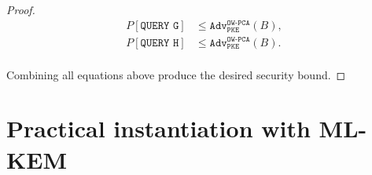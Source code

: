 \documentclass[letterpaper,12pt,titlepage,oneside,final]{book}
\newcommand{\pke}{\texttt{PKE}}
\newcommand{\adv}{\texttt{Adv}}
\begin{document}
\begin{proof}
    \begin{equation*}
        \begin{aligned}
            P\left[\texttt{QUERY G}\right] &\leq \adv^\texttt{OW-PCA}_\pke(B), \\
            P\left[\texttt{QUERY H}\right] &\leq \adv^\texttt{OW-PCA}_\pke(B). \\
        \end{aligned}
    \end{equation*}

    Combining all equations above produce the desired security bound.
\end{proof}

\section{Practical instantiation with ML-KEM}\label{sec:instantiation-with-mlkem}
\end{document}
